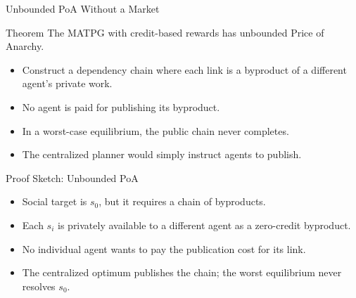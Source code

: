 \documentclass[10pt,aspectratio=169]{beamer}
\begin{document}
\begin{frame}{Unbounded PoA Without a Market}
\small
\begin{block}{Theorem}
The MATPG with credit-based rewards has unbounded Price of Anarchy.
\end{block}

\begin{itemize}
  \item Construct a dependency chain where each link is a byproduct of a different agent's private work.
  \item No agent is paid for publishing its byproduct.
  \item In a worst-case equilibrium, the public chain never completes.
  \item The centralized planner would simply instruct agents to publish.
\end{itemize}
\end{frame}

\begin{frame}{Proof Sketch: Unbounded PoA}
\small
\begin{center}
\end{center}

\small
\begin{itemize}
  \item Social target is $s_0$, but it requires a chain of byproducts.
  \item Each $s_i$ is privately available to a different agent as a zero-credit byproduct.
  \item No individual agent wants to pay the publication cost for its link.
  \item The centralized optimum publishes the chain; the worst equilibrium never resolves $s_0$.
\end{itemize}
\end{frame}
\end{document}
